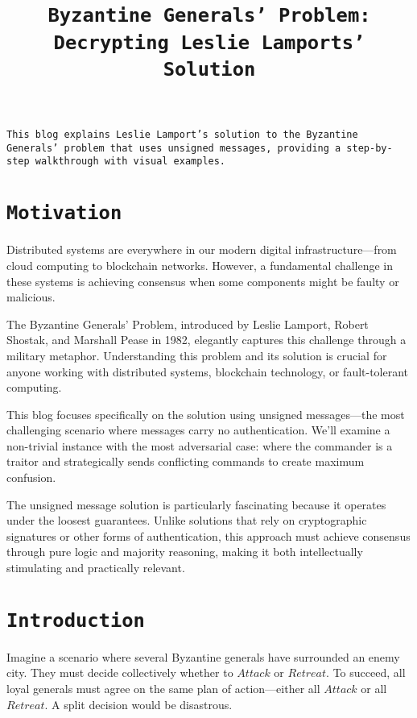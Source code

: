 \documentclass[11pt]{article}
\title{\texttt{\LARGE Byzantine Generals' Problem: \\[0.3em] \Large Decrypting Leslie Lamports' Solution}}
\date{}
\begin{document}
\maketitle

\begin{center}
\begin{minipage}{0.85\textwidth}
\texttt{\large This blog explains Leslie Lamport's solution to the Byzantine Generals' problem that uses unsigned messages, providing a step-by-step walkthrough with visual examples.}
\end{minipage}
\end{center}
\vspace{1em}

\section*{\texttt{\Large Motivation}}
\justifying
Distributed systems are everywhere in our modern digital infrastructure—from cloud computing to blockchain networks. However, a fundamental challenge in these systems is achieving consensus when some components might be faulty or malicious.

The Byzantine Generals' Problem, introduced by Leslie Lamport, Robert Shostak, and Marshall Pease in 1982, elegantly captures this challenge through a military metaphor. Understanding this problem and its solution is crucial for anyone working with distributed systems, blockchain technology, or fault-tolerant computing.

This blog focuses specifically on the solution using unsigned messages—the most challenging scenario where messages carry no authentication. We'll examine a non-trivial instance with the most adversarial case: where the commander is a traitor and strategically sends conflicting commands to create maximum confusion.

The unsigned message solution is particularly fascinating because it operates under the loosest guarantees. Unlike solutions that rely on cryptographic signatures or other forms of authentication, this approach must achieve consensus through pure logic and majority reasoning, making it both intellectually stimulating and practically relevant.
\section*{\texttt{\Large Introduction}}
\justifying
Imagine a scenario where several Byzantine generals have surrounded an enemy city. They must decide collectively whether to $Attack$ or $Retreat$. To succeed, all loyal generals must agree on the same plan of action—either all $Attack$ or all $Retreat$. A split decision would be disastrous.
\end{document}
